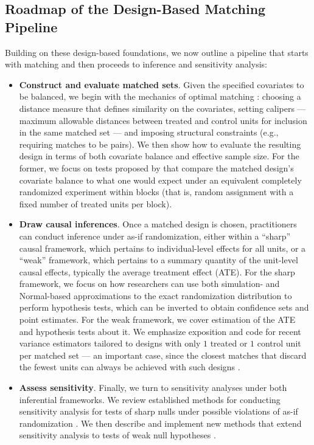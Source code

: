 \documentclass[twoside,11pt]{article}
\begin{document}
\subsection{Roadmap of the Design-Based Matching
Pipeline}\label{roadmap-of-the-design-based-matching-pipeline}

Building on these design-based foundations, we now outline a pipeline
that starts with matching and then proceeds to inference and sensitivity
analysis:

\begin{itemize}
\item
  \textbf{Construct and evaluate matched sets}. Given the specified
  covariates to be balanced, we begin with the mechanics of optimal
  matching \citep{hansen2004, hansenklopfer2006}: choosing a distance
  measure that defines similarity on the covariates, setting calipers
  --- maximum allowable distances between treated and control units for
  inclusion in the same matched set --- and imposing structural
  constraints (e.g., requiring matches to be pairs). We then show how to
  evaluate the resulting design in terms of both covariate balance and effective sample size. For the former, we focus on tests proposed by
  \citet{hansenbowers2008} that compare the matched design's covariate
  balance to what one would expect under an equivalent completely
  randomized experiment within blocks (that is, random assignment with a
  fixed number of treated units per block).
\item
  \textbf{Draw causal inferences}. Once a matched design is chosen,
  practitioners can conduct inference under as-if randomization, either
  within a ``sharp'' causal framework, which pertains to
  individual-level effects for all units, or a ``weak'' framework, which
  pertains to a summary quantity of the unit-level causal effects,
  typically the average treatment effect (ATE). For the sharp framework,
  we focus on how researchers can use both simulation- and Normal-based
  approximations to the exact randomization distribution to perform
  hypothesis tests, which can be inverted to obtain confidence sets and
  point estimates. For the weak framework, we cover estimation of the
  ATE and hypothesis tests about it. We emphasize exposition and code
  for recent variance estimators tailored to designs with only \(1\)
  treated or \(1\) control unit per matched set
  \citep{fogarty2018, pashleymiratrix2021} --- an important case, since the closest matches that discard the fewest units can always be achieved with such designs
  \citep{gurosenbaum1993, rosenbaum1991, hansen2004, hansen2011}.
\item
  \textbf{Assess sensitivity}. Finally, we turn to sensitivity analyses
  under both inferential frameworks. We review established methods for
  conducting sensitivity analysis for tests of sharp nulls under
  possible violations of as-if randomization
  \citep{rosenbaumkrieger1990, gastwirthetal2000, rosenbaum2018}. We
  then describe and implement new methods that extend sensitivity
  analysis to tests of weak null hypotheses \citep{fogarty2023}.
\end{itemize}
\end{document}
